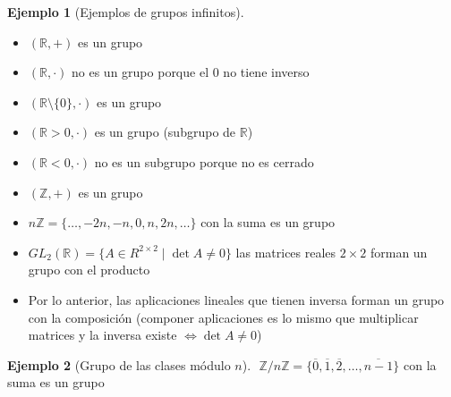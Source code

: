 \documentclass{book}
\theoremstyle{definition}
\newtheorem{ej}{Ejemplo}
\theoremstyle{remark}
\newcommand{\Z}{\mathbb{Z}}
\newcommand{\R}{\mathbb{R}}
\newcommand{\ZnZ}{\mathbb{Z}/n\mathbb{Z}}
\begin{document}
\begin{ej}[Ejemplos de grupos infinitos]$ $\newline
	\begin{itemize}
		\item $(\R, +)$ es un grupo
		\item $(\R, \cdot)$ no es un grupo porque el $0$ no tiene inverso
		\item $(\R\setminus\{0\}, \cdot)$ es un grupo
		\item $(\R > 0, \cdot)$ es un grupo (subgrupo de $\R$)
		\item $(\R < 0, \cdot)$ no es un subgrupo porque no es cerrado
		\item $(\Z, +)$ es un grupo
		\item $n\Z = \{\dots, -2n, -n, 0, n, 2n, \dots\}$ con la suma es un grupo
		\item $GL_2(\R) = \{A \in R^{2\times 2} \mid \det A \neq 0\}$ las matrices reales $2\times 2$ forman un grupo con el producto
		\item Por lo anterior, las aplicaciones lineales que tienen inversa forman un grupo con la composición (componer aplicaciones es lo mismo que multiplicar matrices y la inversa existe $\iff \det A \neq 0$)
	\end{itemize}
\end{ej}

\begin{ej}[Grupo de las clases módulo $n$]$ $\newline
	$\ZnZ = \{\overline{0}, \overline{1}, \overline{2}, \dots, \overline{n-1}\}$ con la suma es un grupo
\end{ej}
\end{document}
